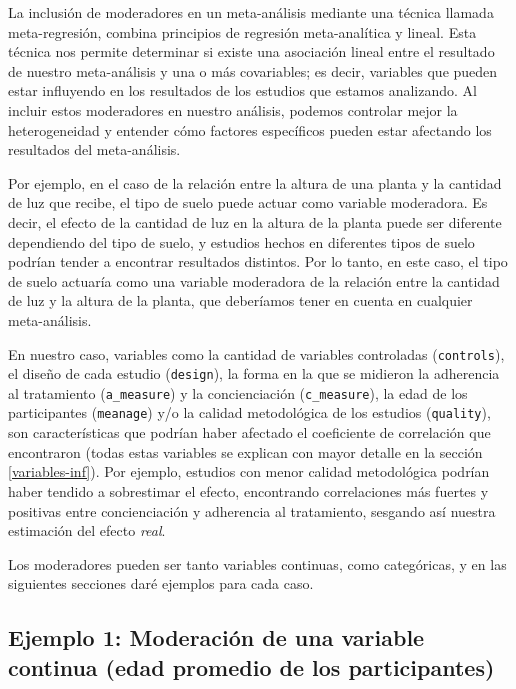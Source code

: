 \documentclass[
  bookmarksnumbered]{article}
\begin{document}
La inclusión de moderadores en un meta-análisis mediante una técnica llamada meta-regresión, combina principios de regresión meta-analítica y lineal. Esta técnica nos permite determinar si existe una asociación lineal entre el resultado de nuestro meta-análisis y una o más covariables; es decir, variables que pueden estar influyendo en los resultados de los estudios que estamos analizando. Al incluir estos moderadores en nuestro análisis, podemos controlar mejor la heterogeneidad y entender cómo factores específicos pueden estar afectando los resultados del meta-análisis.

Por ejemplo, en el caso de la relación entre la altura de una planta y la cantidad de luz que recibe, el tipo de suelo puede actuar como variable moderadora. Es decir, el efecto de la cantidad de luz en la altura de la planta puede ser diferente dependiendo del tipo de suelo, y estudios hechos en diferentes tipos de suelo podrían tender a encontrar resultados distintos. Por lo tanto, en este caso, el tipo de suelo actuaría como una variable moderadora de la relación entre la cantidad de luz y la altura de la planta, que deberíamos tener en cuenta en cualquier meta-análisis.

En nuestro caso, variables como la cantidad de variables controladas (\texttt{controls}), el diseño de cada estudio (\texttt{design}), la forma en la que se midieron la adherencia al tratamiento (\texttt{a\_measure}) y la concienciación (\texttt{c\_measure}), la edad de los participantes (\texttt{meanage}) y/o la calidad metodológica de los estudios (\texttt{quality}), son características que podrían haber afectado el coeficiente de correlación que encontraron (todas estas variables se explican con mayor detalle en la sección \ref{variables-inf}). Por ejemplo, estudios con menor calidad metodológica podrían haber tendido a sobrestimar el efecto, encontrando correlaciones más fuertes y positivas entre concienciación y adherencia al tratamiento, sesgando así nuestra estimación del efecto \emph{real}.

Los moderadores pueden ser tanto variables continuas, como categóricas, y en las siguientes secciones daré ejemplos para cada caso.

\hypertarget{ex.mod1}{%
\subsection{Ejemplo 1: Moderación de una variable continua (edad promedio de los participantes)}\label{ex.mod1}}
\end{document}
